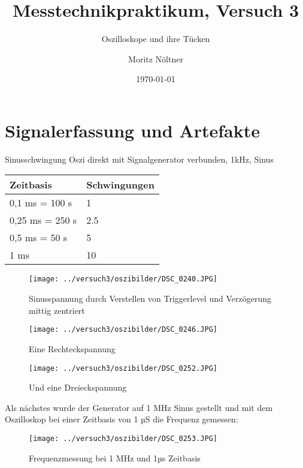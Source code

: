 \documentclass[]{beamer} %
\title[]{Messtechnikpraktikum, Versuch 3}
\subtitle[]{Oszilloskope und ihre Tücken}
\date{\today}
\institute[Uni HD]{ Universität Heidelberg }
\author{ Moritz Nöltner }
\begin{document}
	\begin{frame}[plain]
		\titlepage
		\note{ }
	\end{frame}


	\section{Signalerfassung und Artefakte}
	\begin{frame}{Sinusschwingung}
		Oszi direkt mit Signalgenerator verbunden, 1kHz, Sinus\\

		\begin{tabular}{|l|l|}
			\hline
			Zeitbasis &  Schwingungen \\
			\hline
			\hline
			0,1 ms = 100 \mu s & 1\\
			\hline
			0,25 ms = 250 \mu s & 2.5\\
			\hline
			0,5 ms = 50 \mu s & 5\\
			\hline
			1 ms & 10 \\
			\hline
		\end{tabular}
	\end{frame}

	\begin{frame}
		\begin{figure}[H]
			\centering
			\texttt{[image: ../versuch3/oszibilder/DSC\_0240.JPG]}
			\caption{Sinusspannung durch Verstellen von Triggerlevel und Verzögerung mittig zentriert}
		\end{figure}
	\end{frame}


	\begin{frame}
		\begin{figure}[H]
			\centering
			\texttt{[image: ../versuch3/oszibilder/DSC\_0246.JPG]}
			\caption{Eine Rechteckspannung}
		\end{figure}
	\end{frame}


	\begin{frame}
		\begin{figure}[H]
			\centering
			\texttt{[image: ../versuch3/oszibilder/DSC\_0252.JPG]}
			\caption{Und eine Dreieckspannung}
		\end{figure}
	\end{frame}


	\begin{frame}
		Als nächstes wurde der Generator auf 1 MHz Sinus gestellt und mit dem Oszilloskop bei einer Zeitbasis von 1 µS die Frequenz gemessen:
		\begin{figure}[H]
			\centering
			\texttt{[image: ../versuch3/oszibilder/DSC\_0253.JPG]}
			\caption{Frequenzmessung bei 1 MHz und 1µs Zeitbasis}
		\end{figure}
	\end{frame}
\end{document}
